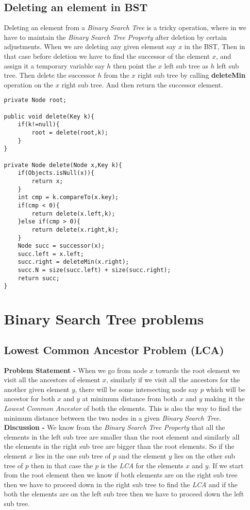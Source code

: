 \documentclass[12pt,a4paper,draft]{article}
\begin{document}
\subsection{Deleting an element in BST}
Deleting an element from a \emph{Binary Search Tree} is a tricky operation, where in we have to maintain the \emph{Binary Search Tree Property} after deletion by certain adjustments. When we are deleting any given element say $x$ in the BST, Then in that case before deletion we have to find the successor of the element $x$, and assign it a temporary variable say $h$ then point the $x$ left sub tree as $h$  left sub tree. Then delete the successor $h$ from the $x$ right sub tree by calling \textbf{deleteMin} operation on the $x$ right sub tree. And then return the successor element.

\begin{lstlisting}[caption={Delete Operation}]
private Node root;

public void delete(Key k){
	if(k!=null){
		root = delete(root,k);
	}
}

private Node delete(Node x,Key k){
	if(Objects.isNull(x)){
		return x;
	}
	int cmp = k.compareTo(x.key);
	if(cmp < 0){
		return delete(x.left,k);
	}else if(cmp > 0){
		return delete(x.right,k);
	}
	Node succ = successor(x);
	succ.left = x.left;
	succ.right = deleteMin(x.right);
	succ.N = size(succ.left) + size(succ.right);
	return succ;
}
\end{lstlisting}
\section{Binary Search Tree problems}
\subsection{Lowest Common Ancestor Problem (LCA)}
\textbf{Problem Statement -} When we go from node $x$ towards the root element we visit all the ancestors of element $x$, similarly if we visit all the ancestors for the another given element $y$, there will be some intersecting node say $p$ which will be ancestor for both $x$ and $y$ at minimum distance from both $x$ and $y$ making it the \emph{Lowest Common Ancestor} of both the elements. This is also the way to find the minimum distance between the two nodes in a given \emph{Binary Search Tree}.
\\
\textbf{Discussion -} We know from the \emph{Binary Search Tree Property} that all the elements in the left sub tree are smaller than the root element and similarly all the elements in the right sub tree are bigger than the root elements. So if the element $x$ lies in the one sub tree of $p$ and the element $y$ lies on the other sub tree of $p$ then in that case the $p$ is the \emph{LCA} for the elements $x$ and $y$. If we start from the root element then we know if both elements are on the right sub tree then we have to proceed down in the right sub tree to find the \emph{LCA} and if the both the elements are on the left sub tree then we have to proceed down the left sub tree.
\end{document}
